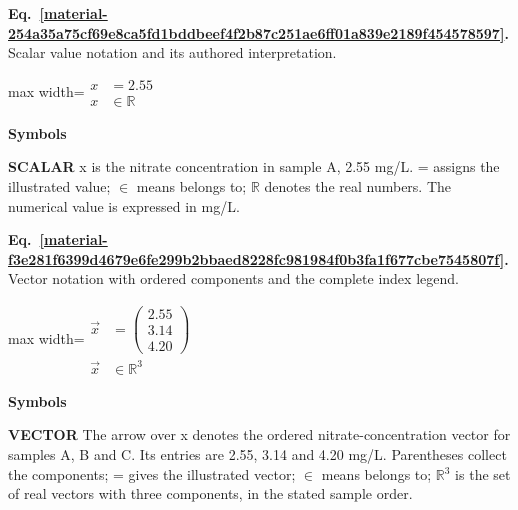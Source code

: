 \documentclass[11pt,a4paper]{article}
\begin{document}
\par\medskip
\noindent\begin{minipage}{\linewidth}
\label{material-254a35a75cf69e8ca5fd1bddbeef4f2b87c251ae6ff01a839e2189f454578597}
\noindent\textbf{Eq.~\ref*{material-254a35a75cf69e8ca5fd1bddbeef4f2b87c251ae6ff01a839e2189f454578597}.} Scalar value notation and its authored interpretation.\par\nopagebreak
\begin{center}\begin{adjustbox}{max width=\linewidth}$\displaystyle \begin{aligned}x &= 2.55\\ x &\in \mathbb{R}\end{aligned}$\end{adjustbox}\end{center}

\par\noindent\textbf{Symbols}

\par\noindent\textbf{SCALAR} x is the nitrate concentration in sample A, 2.55 mg/L. = assigns the illustrated value; \ensuremath{\in} means belongs to; \ensuremath{\mathbb{R}} denotes the real numbers. The numerical value is expressed in mg/L.

\end{minipage}\par
\medskip

\par\medskip
\noindent\begin{minipage}{\linewidth}
\label{material-f3e281f6399d4679e6fe299b2bbaed8228fc981984f0b3fa1f677cbe7545807f}
\noindent\textbf{Eq.~\ref*{material-f3e281f6399d4679e6fe299b2bbaed8228fc981984f0b3fa1f677cbe7545807f}.} Vector notation with ordered components and the complete index legend.\par\nopagebreak
\begin{center}\begin{adjustbox}{max width=\linewidth}$\displaystyle \begin{aligned}\vec{x} &= \begin{pmatrix}2.55\\3.14\\4.20\end{pmatrix}\\ \vec{x} &\in \mathbb{R}^{3}\end{aligned}$\end{adjustbox}\end{center}

\par\noindent\textbf{Symbols}

\par\noindent\textbf{VECTOR} The arrow over x denotes the ordered nitrate-concentration vector for samples A, B and C. Its entries are 2.55, 3.14 and 4.20 mg/L. Parentheses collect the components; = gives the illustrated vector; \ensuremath{\in} means belongs to; \ensuremath{\mathbb{R}}\ensuremath{{}^3} is the set of real vectors with three components, in the stated sample order.

\end{minipage}\par
\medskip
\end{document}
